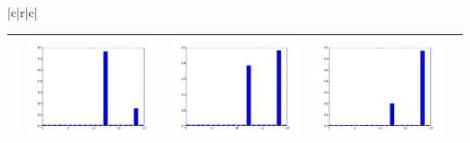\documentclass[twoside,11pt]{article}
\begin{document}
\begin{table}[t]
\begin{center}
{\begin{tabular}{|c|r|c|}
\begin{tabular}{ccccc}
&
\includegraphics[width=\barw\textwidth]{visualize_dist_paMedLDAave_1/1_512} &
\includegraphics[width=\barw\textwidth]{visualize_dist_paMedLDAave_1/1_4096} &
\includegraphics[width=\barw\textwidth]{visualize_dist_paMedLDAave_1/1_11269} \\
\hline
\end{tabular} \\


\end{tabular}}
\end{center}
\end{table}
\end{document}
